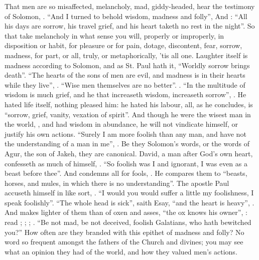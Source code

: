 That men are so misaffected, melancholy, mad, giddy-headed, hear the testimony
of Solomon, . \enquote{And I turned to behold wisdom,
madness and folly}, \etc{} And : \enquote{All his days are sorrow, his
travel grief, and his heart taketh no rest in the night}. So that take
melancholy in what sense you will, properly or improperly, in disposition or
habit, for pleasure or for pain, dotage, discontent, fear, sorrow, madness, for
part, or all, truly, or metaphorically, 'tis all one. Laughter itself is
madness according to Solomon, and as St. Paul hath it, \enquote{Worldly sorrow brings
death}. \enquote{The hearts of the sons of men are evil, and madness is in their hearts
while they live}, . \enquote{Wise men themselves are no
better}. . \enquote{In the multitude of wisdom is much grief,
and he that increaseth wisdom, increaseth sorrow}, .
He hated life itself, nothing pleased him: he hated his labour, all, as
he concludes, is \enquote{sorrow, grief, vanity, vexation of
spirit}. And though he were the wisest man in the world, , and had wisdom in abundance, he will not vindicate himself, or
justify his own actions. \enquote{Surely I am more foolish than any man, and have not
the understanding of a man in me}, . Be they
Solomon's words, or the words of Agur, the son of Jakeh, they are canonical.
David, a man after God's own heart, confesseth as much of himself,
. \enquote{So foolish was I and ignorant, I was even
as a beast before thee}. And condemns all for fools, . He compares them to \enquote{beasts,
horses, and mules, in which there is no understanding}. The apostle Paul
accuseth himself in like sort, . \enquote{I would you would
suffer a little my foolishness, I speak foolishly}. \enquote{The whole head is sick},
saith Esay, \enquote{and the heart is heavy}, . And makes
lighter of them than of oxen and asses, \enquote{the ox knows his owner}, \etc{}: read
; ; ; . \enquote{Be not mad, be not deceived, foolish
Galatians, who hath bewitched you?} How often are they branded with this
epithet of madness and folly? No word so frequent amongst the fathers of the
Church and divines; you may see what an opinion they had of the world, and how
they valued men's actions.

